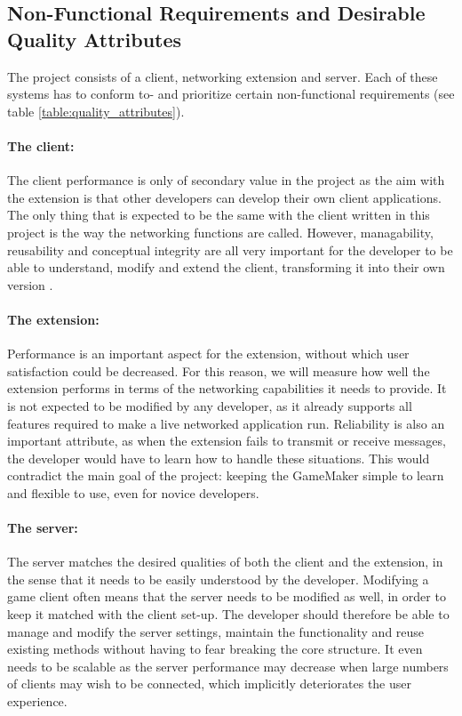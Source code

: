 \documentclass[bsc, 12pt, twoside, singlespacing, parskip, abbrevs, notimes, normalheadings, logo, deptreport]{styles/infthesis}
\begin{document}
\subsection{Non-Functional Requirements and Desirable Quality Attributes}
The project consists of a client, networking extension and server. Each of these systems has to conform to- and prioritize certain non-functional requirements (see table \ref{table:quality_attributes}).

\paragraph*{The client:}
The client performance is only of secondary value in the project as the aim with the extension is that other developers can develop their own client applications. The only thing that is expected to be the same with the client written in this project is the way the networking functions are called. However, managability, reusability and conceptual integrity are all very important for the developer to be able to understand, modify and extend the client, transforming it into their own version \cite{Friendly_Programming}.

\paragraph*{The extension:}
Performance is an important aspect for the extension, without which user satisfaction could be decreased. For this reason, we will measure how well the extension performs in terms of the networking capabilities it needs to provide. It is not expected to be modified by any developer, as it already supports all features required to make a live networked application run. Reliability is also an important attribute, as when the extension fails to transmit or receive messages, the developer would have to learn how to handle these situations. This would contradict the main goal of the project: keeping the GameMaker simple to learn and flexible to use, even for novice developers.

\paragraph*{The server:}
The server matches the desired qualities of both the client and the extension, in the sense that it needs to be easily understood by the developer. Modifying a game client often means that the server needs to be modified as well, in order to keep it matched with the client set-up. The developer should therefore be able to manage and modify the server settings, maintain the functionality and reuse existing methods without having to fear breaking the core structure. It even needs to be scalable as the server performance may decrease when large numbers of clients may wish to be connected, which implicitly deteriorates the user experience.
\end{document}
